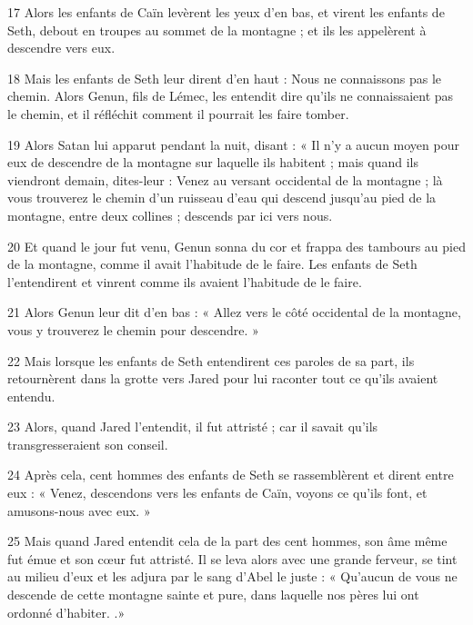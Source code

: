 \par 17 Alors les enfants de Caïn levèrent les yeux d'en bas, et virent les enfants de Seth, debout en troupes au sommet de la montagne ; et ils les appelèrent à descendre vers eux.

\par 18 Mais les enfants de Seth leur dirent d'en haut : Nous ne connaissons pas le chemin. Alors Genun, fils de Lémec, les entendit dire qu'ils ne connaissaient pas le chemin, et il réfléchit comment il pourrait les faire tomber.

\par 19 Alors Satan lui apparut pendant la nuit, disant : « Il n'y a aucun moyen pour eux de descendre de la montagne sur laquelle ils habitent ; mais quand ils viendront demain, dites-leur : Venez au versant occidental de la montagne ; là vous trouverez le chemin d'un ruisseau d'eau qui descend jusqu'au pied de la montagne, entre deux collines ; descends par ici vers nous.

\par 20 Et quand le jour fut venu, Genun sonna du cor et frappa des tambours au pied de la montagne, comme il avait l'habitude de le faire. Les enfants de Seth l'entendirent et vinrent comme ils avaient l'habitude de le faire.

\par 21 Alors Genun leur dit d'en bas : « Allez vers le côté occidental de la montagne, vous y trouverez le chemin pour descendre. »

\par 22 Mais lorsque les enfants de Seth entendirent ces paroles de sa part, ils retournèrent dans la grotte vers Jared pour lui raconter tout ce qu'ils avaient entendu.

\par 23 Alors, quand Jared l'entendit, il fut attristé ; car il savait qu'ils transgresseraient son conseil.

\par 24 Après cela, cent hommes des enfants de Seth se rassemblèrent et dirent entre eux : « Venez, descendons vers les enfants de Caïn, voyons ce qu'ils font, et amusons-nous avec eux. »

\par 25 Mais quand Jared entendit cela de la part des cent hommes, son âme même fut émue et son cœur fut attristé. Il se leva alors avec une grande ferveur, se tint au milieu d'eux et les adjura par le sang d'Abel le juste : « Qu'aucun de vous ne descende de cette montagne sainte et pure, dans laquelle nos pères lui ont ordonné d'habiter. .»

